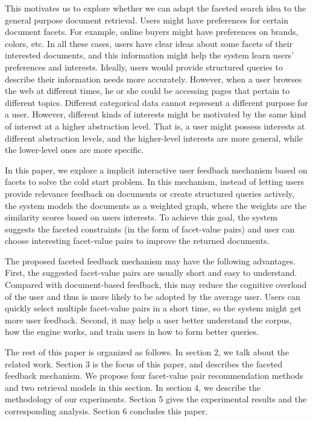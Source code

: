 This motivates us to explore whether we can adapt the faceted search idea to the general purpose document retrieval. Users might have preferences for certain document facets. For example, online buyers might have preferences on brands, colors, etc. In all these cases, users have clear ideas about some facets of their interested documents, and this information might help the system learn users' preferences and interests. Ideally, users would provide structured queries to describe their information needs more accurately. However, when a user browses the web at different times, he or she could be accessing pages that pertain to different topics. Different categorical data cannot represent a different purpose for a user. However, different kinds of interests might be motivated by the same kind of interest at a higher abstraction level. That is, a user might possess interests at different abstraction levels, and the higher-level interests are more general, while the lower-level ones are more specific.

In this paper, we explore a implicit interactive user feedback mechanism based on facets to solve the cold start problem. In this mechanism, instead of letting users provide relevance feedback on documents or create structured queries actively, the system models the documents as a weighted graph, where the weights are the similarity scores based on users interests. To achieve this goal, the system suggests the faceted constraints (in the form of facet-value pairs) and user can choose interesting facet-value pairs to improve the returned documents.

The proposed faceted feedback mechanism may have the following advantages. First, the suggested facet-value pairs are usually short and easy to understand. Compared with document-based feedback, this may reduce the cognitive overload of the user and thus is more likely to be adopted by the average user. Users can quickly select multiple facet-value pairs in a short time, so the system might get more user feedback. Second, it may help a user better understand the corpus, how the engine works, and train users in how to form better queries.

The rest of this paper is organized as follows. In section 2, we talk about the related work. Section 3 is the focus of this paper, and describes the faceted feedback mechanism. We propose four facet-value pair recommendation methods and two retrieval models in this section. In section 4, we describe the methodology of our experiments. Section 5 gives the experimental results and the corresponding analysis. Section 6 concludes this paper.
